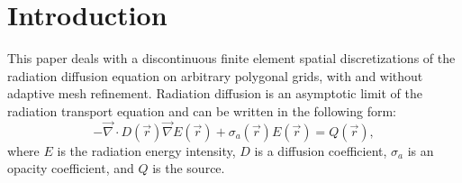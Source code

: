\documentclass[preprint,10pt]{elsarticle}
\renewcommand{\div}{\vec{\nabla}\! \cdot \!}
\newcommand{\grad}{\vec{\nabla}}
\newcommand{\vr}{\vec{r}}
\renewcommand{\(}{\left(}
\renewcommand{\)}{\right)}
\renewcommand{\[}{\left[}
\renewcommand{\]}{\right]}
\begin{document}

\linenumbers

\section{Introduction} \label{sec:intro}

This paper deals with a discontinuous finite element spatial discretizations of the radiation 
diffusion equation on arbitrary polygonal grids, with and without adaptive mesh refinement. 
Radiation diffusion is an asymptotic limit of the radiation transport equation and can be 
written in the following form:
\begin{equation} \label{eq:radiation_diffusion}
- \div  D(\vr) \grad E(\vr) + \sigma_a(\vr) E(\vr) = Q(\vr) ,
\end{equation}
where $E$ is the radiation energy intensity, $D$ is a diffusion coefficient, $\sigma_a$ is 
an opacity coefficient, and $Q$ is the source.
\end{document}
